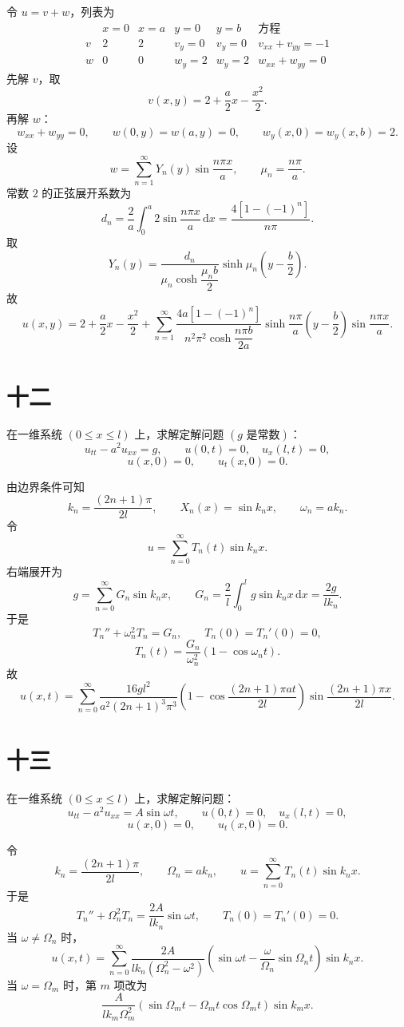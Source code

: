 \documentclass[UTF8,zihao=-4]{ctexart}
\begin{document}
令 $u=v+w$，列表为
\[
\begin{array}{c|cc|cc|c}
 & x=0 & x=a & y=0 & y=b & \text{方程}\\ \hline
v & 2 & 2 & v_y=0 & v_y=0 & v_{xx}+v_{yy}=-1\\
w & 0 & 0 & w_y=2 & w_y=2 & w_{xx}+w_{yy}=0
\end{array}
\]
先解 $v$，取
\[
v(x,y)=2+\dfrac{a}{2}x-\dfrac{x^2}{2}.
\]
再解 $w$：
\[
w_{xx}+w_{yy}=0,\qquad w(0,y)=w(a,y)=0,\qquad
w_y(x,0)=w_y(x,b)=2.
\]
设
\[
w=\sum_{n=1}^{\infty}Y_n(y)\sin\dfrac{n\pi x}{a},\qquad
\mu_n=\dfrac{n\pi}{a}.
\]
常数 $2$ 的正弦展开系数为
\[
d_n=\dfrac{2}{a}\int_0^a2\sin\dfrac{n\pi x}{a}\,\mathrm{d}x
=\dfrac{4[1-(-1)^n]}{n\pi}.
\]
取
\[
Y_n(y)=\dfrac{d_n}{\mu_n\cosh\dfrac{\mu_nb}{2}}
\sinh\mu_n\left(y-\dfrac b2\right).
\]
故
\[
u(x,y)=2+\dfrac{a}{2}x-\dfrac{x^2}{2}
+\sum_{n=1}^{\infty}
\dfrac{4a[1-(-1)^n]}{n^2\pi^2\cosh\dfrac{n\pi b}{2a}}
\sinh\dfrac{n\pi}{a}\left(y-\dfrac b2\right)
\sin\dfrac{n\pi x}{a}.
\]

\section*{十二}

在一维系统 $(0\le x\le l)$ 上，求解定解问题 $(g\text{ 是常数})$：
\[
u_{tt}-a^2u_{xx}=g,\qquad
u(0,t)=0,\quad u_x(l,t)=0,
\]
\[
u(x,0)=0,\qquad u_t(x,0)=0.
\]

由边界条件可知
\[
k_n=\dfrac{(2n+1)\pi}{2l},\qquad X_n(x)=\sin k_nx,\qquad
\omega_n=ak_n.
\]
令
\[
u=\sum_{n=0}^{\infty}T_n(t)\sin k_nx.
\]
右端展开为
\[
g=\sum_{n=0}^{\infty}G_n\sin k_nx,\qquad
G_n=\dfrac{2}{l}\int_0^lg\sin k_nx\,\mathrm{d}x
=\dfrac{2g}{lk_n}.
\]
于是
\[
T_n''+\omega_n^2T_n=G_n,\qquad T_n(0)=T_n'(0)=0,
\]
\[
T_n(t)=\dfrac{G_n}{\omega_n^2}(1-\cos\omega_nt).
\]
故
\[
u(x,t)=\sum_{n=0}^{\infty}
\dfrac{16gl^2}{a^2(2n+1)^3\pi^3}
\left(1-\cos\dfrac{(2n+1)\pi at}{2l}\right)
\sin\dfrac{(2n+1)\pi x}{2l}.
\]

\section*{十三}

在一维系统 $(0\le x\le l)$ 上，求解定解问题：
\[
u_{tt}-a^2u_{xx}=A\sin\omega t,\qquad
u(0,t)=0,\quad u_x(l,t)=0,
\]
\[
u(x,0)=0,\qquad u_t(x,0)=0.
\]

令
\[
k_n=\dfrac{(2n+1)\pi}{2l},\qquad \Omega_n=ak_n,\qquad
u=\sum_{n=0}^{\infty}T_n(t)\sin k_nx.
\]
于是
\[
T_n''+\Omega_n^2T_n=\dfrac{2A}{lk_n}\sin\omega t,\qquad
T_n(0)=T_n'(0)=0.
\]
当 $\omega\ne\Omega_n$ 时，
\[
u(x,t)=\sum_{n=0}^{\infty}
\dfrac{2A}{lk_n(\Omega_n^2-\omega^2)}
\left(\sin\omega t-\dfrac{\omega}{\Omega_n}\sin\Omega_nt\right)\sin k_nx.
\]
当 $\omega=\Omega_m$ 时，第 $m$ 项改为
\[
\dfrac{A}{lk_m\Omega_m^2}
\left(\sin\Omega_mt-\Omega_mt\cos\Omega_mt\right)\sin k_mx.
\]
\end{document}
